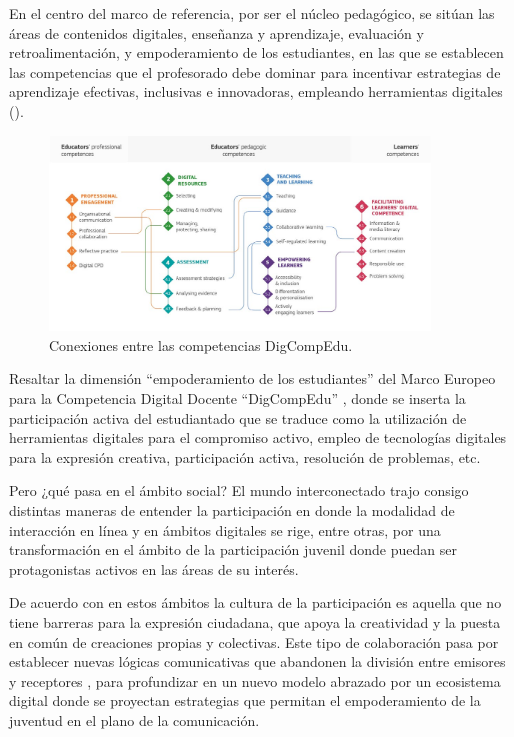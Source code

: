 \documentclass[spanish]{textolivre}
\begin{document}
En el centro del marco de referencia, por ser el núcleo pedagógico, se sitúan las áreas de contenidos digitales, enseñanza y aprendizaje, evaluación y retroalimentación, y empoderamiento de los estudiantes, en las que se establecen las competencias que el profesorado debe dominar para incentivar estrategias de aprendizaje efectivas, inclusivas e innovadoras, empleando herramientas digitales ().

\begin{figure}[h!]
    \centering
    \includegraphics[width=0.9\textwidth]{fig02.png}
    \caption{Conexiones entre las competencias DigCompEdu.}
    \label{fig02}
\end{figure}

Resaltar la dimensión “empoderamiento de los estudiantes” del Marco Europeo para la Competencia Digital Docente “DigCompEdu” \cite{christine_redecker_european_2017}, donde se inserta la participación activa del estudiantado que se traduce como la utilización de herramientas digitales para el compromiso activo, empleo de tecnologías digitales para la expresión creativa, participación activa, resolución de problemas, etc.

Pero ¿qué pasa en el ámbito social? El mundo interconectado trajo consigo distintas maneras de entender la participación en donde la modalidad de interacción en línea y en ámbitos digitales se rige, entre otras, por una transformación en el ámbito de la participación juvenil donde puedan ser protagonistas activos en las áreas de su interés.

De acuerdo con \textcite{aparici_cultura_2013} en estos ámbitos la cultura de la participación es aquella que no tiene barreras para la expresión ciudadana, que apoya la creatividad y la puesta en común de creaciones propias y colectivas. Este tipo de colaboración pasa por establecer nuevas lógicas comunicativas que abandonen la división entre emisores y receptores \cite{aparici_comunicar_2018}, para profundizar en un nuevo modelo abrazado por un ecosistema digital donde se proyectan estrategias que permitan el empoderamiento de la juventud en el plano de la comunicación.
\end{document}
